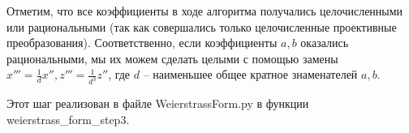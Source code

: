 \begin{itemize}[leftmargin=0.6cm]
    \begin{remark*}
        Отметим, что все коэффициенты в ходе алгоритма получались
        целочисленными или рациональными (так как совершались только
        целочисленные проективные преобразования). Соответственно, если
        коэффициенты \(a, b\) оказались рациональными, мы их можем сделать
        целыми с помощью замены \(x''' = \frac{1}{d} x'', z''' = \frac{1}{d^3}
        z''\), где \(d\) -- наименьшее общее кратное знаменателей \(a, b\).
    \end{remark*}

    Этот шаг реализован в файле \textsf{WeierstrassForm.py} в функции
    \textsf{weierstrass\_form\_step3}.
\end{itemize}


\bigskip
\bigskip
